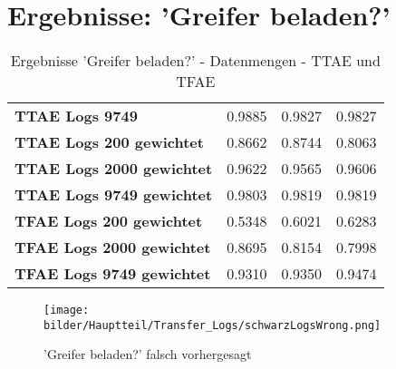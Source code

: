 \chapter{Ergebnisse: 'Greifer beladen?'}
\label{appendix:BaumstammImGreifer}

	
	\begin{table}[ht]
	\centering
	\begin{tabularx}{\textwidth}{llll}
		\rowcolor{Gray}	\textbf{TTAE Logs 9749} 			& 0.9885 & 0.9827 & 0.9827	\\ 
		\textbf{TTAE Logs 200 gewichtet}	& 0.8662 & 0.8744 & 0.8063 	\\		
		\textbf{TTAE Logs 2000 gewichtet}	& 0.9622 & 0.9565 & 0.9606  \\	
		\textbf{TTAE Logs 9749 gewichtet}	& 0.9803 & 0.9819 & 0.9819	\\	
		\textbf{TFAE Logs 200 gewichtet}	 	    & 0.5348 & 0.6021 & 0.6283 	\\		
		\textbf{TFAE Logs 2000 gewichtet}	 	    & 0.8695 & 0.8154 & 0.7998 	\\	
		\textbf{TFAE Logs 9749 gewichtet}	 	    & 0.9310 & 0.9350 & 0.9474  \\	
	\end{tabularx}
	\caption{Ergebnisse 'Greifer beladen?' - Datenmengen - TTAE und TFAE}
	\label{table:Ergebnisse_Transfer_Logs}
\end{table}


\begin{figure}[h]
	\centering
	\texttt{[image: bilder/Hauptteil/Transfer\_Logs/schwarzLogsWrong.png]}
	\caption{'Greifer beladen?' falsch vorhergesagt}
	\label{img:LogsFalschVorhergesagt}
\end{figure}